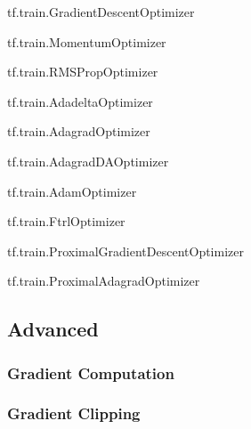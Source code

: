 tf.train.GradientDescentOptimizer

tf.train.MomentumOptimizer

tf.train.RMSPropOptimizer

tf.train.AdadeltaOptimizer

tf.train.AdagradOptimizer

tf.train.AdagradDAOptimizer

tf.train.AdamOptimizer

tf.train.FtrlOptimizer

tf.train.ProximalGradientDescentOptimizer

tf.train.ProximalAdagradOptimizer

\subsection{Advanced}

\subsubsection{Gradient Computation}

\subsubsection{Gradient Clipping}